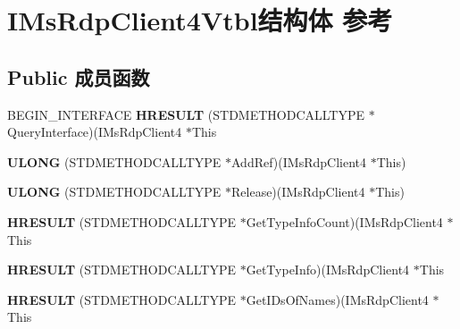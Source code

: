 \hypertarget{struct_i_ms_rdp_client4_vtbl}{}\section{I\+Ms\+Rdp\+Client4\+Vtbl结构体 参考}
\label{struct_i_ms_rdp_client4_vtbl}
\subsection*{Public 成员函数}
\begin{DoxyCompactItemize}
\item 
\mbox{\label{struct_i_ms_rdp_client4_vtbl_afbf1f5f136e9af4f633984da07abec4c}} 
B\+E\+G\+I\+N\+\_\+\+I\+N\+T\+E\+R\+F\+A\+CE {\bfseries H\+R\+E\+S\+U\+LT} (S\+T\+D\+M\+E\+T\+H\+O\+D\+C\+A\+L\+L\+T\+Y\+PE $\ast$Query\+Interface)(I\+Ms\+Rdp\+Client4 $\ast$This
\item 
\mbox{\label{struct_i_ms_rdp_client4_vtbl_aa5dfd27a5eaf417ff566a957c721f5bb}} 
{\bfseries U\+L\+O\+NG} (S\+T\+D\+M\+E\+T\+H\+O\+D\+C\+A\+L\+L\+T\+Y\+PE $\ast$Add\+Ref)(I\+Ms\+Rdp\+Client4 $\ast$This)
\item 
\mbox{\label{struct_i_ms_rdp_client4_vtbl_a69b87797b1ff9b4fd0d80cdd1b91ac7f}} 
{\bfseries U\+L\+O\+NG} (S\+T\+D\+M\+E\+T\+H\+O\+D\+C\+A\+L\+L\+T\+Y\+PE $\ast$Release)(I\+Ms\+Rdp\+Client4 $\ast$This)
\item 
\mbox{\label{struct_i_ms_rdp_client4_vtbl_a38a03f3ded0988a97277b0de9244c8fb}} 
{\bfseries H\+R\+E\+S\+U\+LT} (S\+T\+D\+M\+E\+T\+H\+O\+D\+C\+A\+L\+L\+T\+Y\+PE $\ast$Get\+Type\+Info\+Count)(I\+Ms\+Rdp\+Client4 $\ast$This
\item 
\mbox{\label{struct_i_ms_rdp_client4_vtbl_a3d17bc935c606884aa46b083a728226e}} 
{\bfseries H\+R\+E\+S\+U\+LT} (S\+T\+D\+M\+E\+T\+H\+O\+D\+C\+A\+L\+L\+T\+Y\+PE $\ast$Get\+Type\+Info)(I\+Ms\+Rdp\+Client4 $\ast$This
\item 
\mbox{\label{struct_i_ms_rdp_client4_vtbl_aa30ee8d59b866b4db2f1afb2d6edbd59}} 
{\bfseries H\+R\+E\+S\+U\+LT} (S\+T\+D\+M\+E\+T\+H\+O\+D\+C\+A\+L\+L\+T\+Y\+PE $\ast$Get\+I\+Ds\+Of\+Names)(I\+Ms\+Rdp\+Client4 $\ast$This

\end{DoxyCompactItemize}

